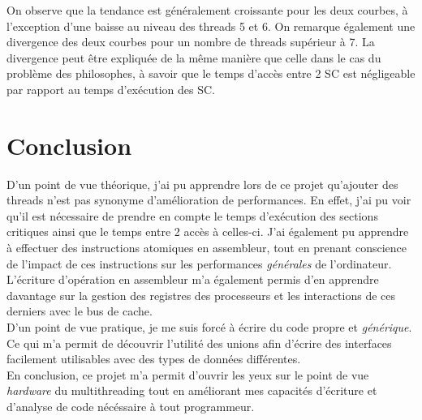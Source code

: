 \noindent On observe que la tendance est généralement croissante pour les deux courbes, à l'exception d'une baisse au niveau des threads 5 et 6. On remarque également une divergence des deux courbes pour un nombre de threads supérieur à 7.
La divergence peut être expliquée de la même manière que celle dans le cas du problème des philosophes, à savoir que le temps d'accès entre 2 SC est négligeable par rapport au temps d'exécution des SC. 

\newpage
\section{Conclusion}

D'un point de vue théorique, j'ai pu apprendre lors de ce projet qu'ajouter des threads n'est pas synonyme d'amélioration de performances.
En effet, j'ai pu voir qu'il est nécessaire de prendre en compte le temps d'exécution des sections critiques ainsi que le temps entre 2 accès à celles-ci. 
J'ai également pu apprendre à effectuer des instructions atomiques en assembleur, tout en prenant conscience de l'impact de ces instructions sur les performances \textit{générales} de l'ordinateur. 
L'écriture d'opération en assembleur m'a également permis d'en apprendre davantage sur la gestion des registres des processeurs et les interactions de ces derniers avec le bus de cache. \\

\noindent D'un point de vue pratique, je me suis forcé à écrire du code propre et \textit{générique}. Ce qui m'a permit de découvrir l'utilité des unions afin d'écrire des interfaces facilement utilisables avec des types de données différentes. \\

\noindent En conclusion, ce projet m'a permit d'ouvrir les yeux sur le point de vue \textit{hardware} du multithreading tout en améliorant mes capacités d'écriture et d'analyse de code nécéssaire à tout programmeur.




